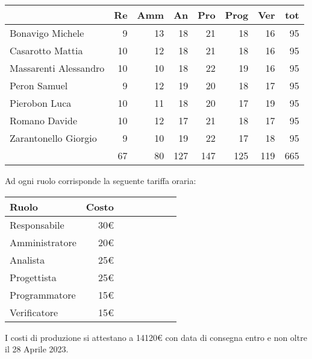 \begin{table}[H]
    \begin{tabularx}{\linewidth}{X|rrrrrrr}
    \rowcolor{gray!30}& Re & Amm & An & Pro & Prog & Ver & tot \\
    \hline
    Bonavigo Michele                        & 9 & 13 & 18 & 21 & 18 & 16 & 95 \\
    \rowcolor{gray!10}Casarotto Mattia      & 10 & 12 & 18 & 21 & 18 & 16 & 95 \\
    Massarenti Alessandro                   & 10 & 10 & 18 & 22 & 19 & 16 & 95 \\
    \rowcolor{gray!10}Peron Samuel          & 9 & 12 & 19 & 20 & 18 & 17 & 95 \\
    Pierobon Luca                           & 10 & 11 & 18 & 20 & 17 & 19 & 95 \\
    \rowcolor{gray!10}Romano Davide         & 10 & 12 & 17 & 21 & 18 & 17 & 95 \\
    Zarantonello Giorgio                    & 9 & 10 & 19 & 22 & 17 & 18 & 95 \\
    \hline                                  & 67 & 80 & 127 & 147 & 125 & 119 & 665 \\ 
    \end{tabularx}
\end{table}

Ad ogni ruolo corrisponde la seguente tariffa oraria:

\begin{table}[H]
    \begin{tabularx}{\linewidth}{X|rrrrrrr}
    \rowcolor{gray!30}Ruolo & Costo \\
    \hline
    Responsabile                       & 30€ \\
    \rowcolor{gray!10}Amministratore   & 20€ \\
    Analista                           & 25€ \\
    \rowcolor{gray!10}Progettista       & 25€ \\
    Programmatore                       & 15€ \\
    \rowcolor{gray!10}Verificatore      & 15€ \\
    \hline
    \end{tabularx}
\end{table}

I costi di produzione si attestano a 14120€ con data di consegna entro e non oltre il 28 Aprile 2023.












